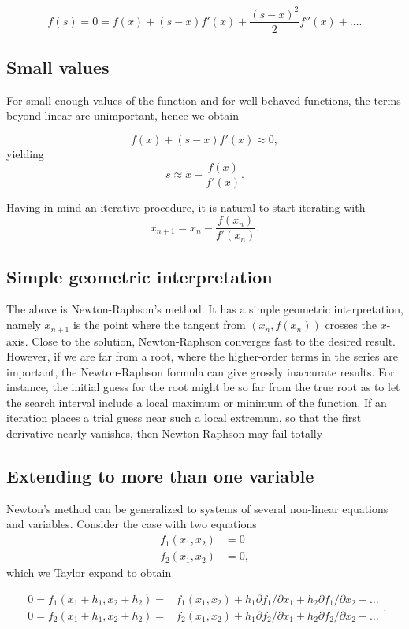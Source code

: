 \documentclass[%
oneside,                 %
final,                   %
10pt]{article}
\begin{document}
\[
    f(s)=0=f(x)+(s-x)f'(x)+\frac{(s-x)^2}{2}f''(x) +\dots.
    \label{eq:taylornr}
\]

\subsection{Small values}

For small enough values of the function and for well-behaved
functions, the terms beyond linear are unimportant, hence we obtain

\[
   f(x)+(s-x)f'(x)\approx 0,
\]
yielding
\[
   s\approx x-\frac{f(x)}{f'(x)}.
\]

Having in mind an iterative procedure, it is natural to start iterating with
\[
   x_{n+1}=x_n-\frac{f(x_n)}{f'(x_n)}.
\]

\subsection{Simple geometric interpretation}

The above is Newton-Raphson's method. It has a simple geometric
interpretation, namely $x_{n+1}$ is the point where the tangent from
$(x_n,f(x_n))$ crosses the $x$-axis.  Close to the solution,
Newton-Raphson converges fast to the desired result. However, if we
are far from a root, where the higher-order terms in the series are
important, the Newton-Raphson formula can give grossly inaccurate
results. For instance, the initial guess for the root might be so far
from the true root as to let the search interval include a local
maximum or minimum of the function.  If an iteration places a trial
guess near such a local extremum, so that the first derivative nearly
vanishes, then Newton-Raphson may fail totally

\subsection{Extending to more than one variable}

Newton's method can be generalized to systems of several non-linear equations
and variables. Consider the case with two equations
\[
   \begin{array}{cc} f_1(x_1,x_2) &=0\\
                     f_2(x_1,x_2) &=0,\end{array}
\]
which we Taylor expand to obtain

\[
   \begin{array}{cc} 0=f_1(x_1+h_1,x_2+h_2)=&f_1(x_1,x_2)+h_1
                     \partial f_1/\partial x_1+h_2
                     \partial f_1/\partial x_2+\dots\\
                     0=f_2(x_1+h_1,x_2+h_2)=&f_2(x_1,x_2)+h_1
                     \partial f_2/\partial x_1+h_2
                     \partial f_2/\partial x_2+\dots
                       \end{array}.
\]
\end{document}
